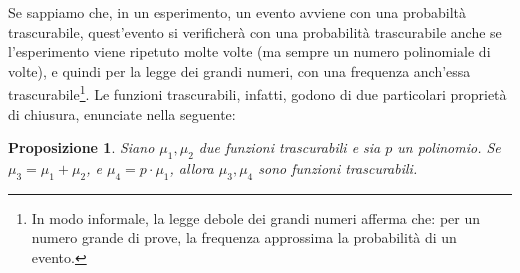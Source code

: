 \documentclass[a4paper,openright,twoside,12pt]{report}
\newtheorem{proposizione}{Proposizione}[chapter]
\begin{document}
Se sappiamo che, in un esperimento, un evento avviene con una probabilt\`a trascurabile,
quest'evento si verificher\`a con una probabilit\`a trascurabile anche se l'esperimento viene ripetuto molte volte (ma sempre un numero polinomiale di volte), e quindi per la legge dei grandi numeri, 
con una frequenza anch'essa trascurabile\footnote{In modo informale, la legge debole dei grandi numeri afferma che: per un numero grande di prove, 
la frequenza approssima la probabilit\`a di un evento.}. 
Le funzioni trascurabili, infatti, godono di due particolari propriet\`a di chiusura, enunciate nella seguente:
\begin{proposizione}
Siano $\mu_1, \mu_2$ due funzioni trascurabili e sia $p$ un polinomio. Se $\mu_3 = \mu_1 + \mu_2$, e $\mu_4= p\cdot \mu_1$, allora $\mu_3, \mu_4$ sono funzioni trascurabili.  
\end{proposizione} 
\end{document}
